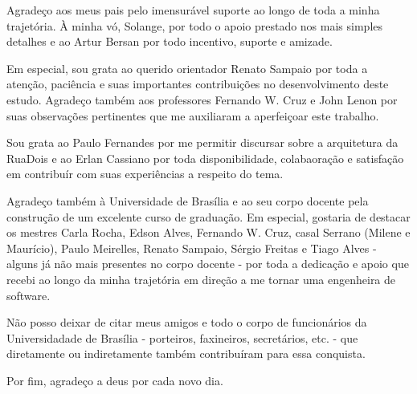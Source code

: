 \begin{agradecimentos}
    Agradeço aos meus pais pelo imensurável suporte ao longo de toda a minha trajetória.
    À minha vó, Solange, por todo o apoio prestado nos mais simples detalhes e ao Artur
    Bersan por todo incentivo, suporte e amizade.

    Em especial, sou grata ao querido orientador Renato Sampaio por toda a atenção, paciência
    e suas importantes contribuições no desenvolvimento deste estudo.
    Agradeço também aos professores Fernando W. Cruz e John Lenon por suas observações pertinentes
    que me auxiliaram a aperfeiçoar este trabalho.

    Sou grata ao Paulo Fernandes por me permitir discursar sobre a arquitetura da RuaDois e ao
    Erlan Cassiano por toda disponibilidade, colabaoração e satisfação em contribuír com suas
    experiências a respeito do tema.

    Agradeço também à Universidade de Brasília e ao seu corpo docente pela construção de um
    excelente curso de graduação. Em especial, gostaria de destacar os mestres Carla Rocha, Edson Alves,
    Fernando W. Cruz, casal Serrano (Milene e Maurício), Paulo Meirelles, Renato Sampaio, Sérgio Freitas
    e Tiago Alves - alguns já não mais presentes no corpo docente - por toda a dedicação e apoio que
    recebi ao longo da minha trajetória em direção a me tornar uma engenheira de software.

    Não posso deixar de citar meus amigos e todo o corpo de funcionários da Universidadade de
    Brasília - porteiros, faxineiros, secretários, etc. - que diretamente ou indiretamente também
    contribuíram para essa conquista.

    Por fim, agradeço a deus por cada novo dia.
\end{agradecimentos}
